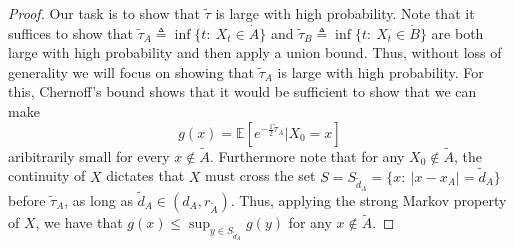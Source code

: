 \documentclass[english, aip, jcp, priprint, graphicx,floatfix]{revtex4-1}
\theoremstyle{plain}
\theoremstyle{definition}
\theoremstyle{plain}
\begin{document}
\begin{proof}
Our task is to show that $\tilde \tau$ is large with high probability.  Note that it suffices to show that $\tilde \tau_A \triangleq \inf\{t:\ X_t\in \dot A\}$ and $\tilde \tau_B \triangleq \inf\{t:\ X_t\in \dot B\}$ are both large with high probability and then apply a union bound.  Thus, without loss of generality we will focus on showing that $\tilde \tau_A$ is large with high probability.  For this, Chernoff's bound shows that it would be sufficient to show that we can make
\[
g(x)=\mathbb{E}[e^{-\frac{1}{2}\tilde \tau_A}|X_0=x]
\] 
aribitrarily small for every $x\notin \tilde A$.  Furthermore note that for any $X_0 \notin \tilde A$, the continuity of $X$ dictates that $X$ must cross the set $S=S_{\tilde d_A}=\{x:\ |x-x_A| = \tilde d_A\}$ before $\tilde \tau_A$, as long as $\tilde d_A \in (d_A,r_{\tilde A})$.  Thus, applying the strong Markov property of $X$, we have that $g(x)\leq \sup_{y\in S_{\tilde d_A}}g(y)$ for any $x \notin \tilde A$.


\end{proof}
\end{document}
